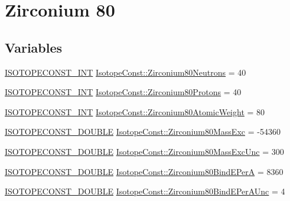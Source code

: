 \hypertarget{group___isotope_const-_zirconium-_zr80}{}\section{Zirconium 80}
\label{group___isotope_const-_zirconium-_zr80}
\subsection*{Variables}
\begin{DoxyCompactItemize}
\item 
\mbox{\hyperlink{group___isotope_const-_macros_ga5f18360b3e99483a35c32d789e62621c}{I\+S\+O\+T\+O\+P\+E\+C\+O\+N\+S\+T\+\_\+\+I\+NT}} \mbox{\hyperlink{group___isotope_const-_zirconium-_zr80_gaae5a1c6b83ec6385f82de4f3098d882a}{Isotope\+Const\+::\+Zirconium80\+Neutrons}} = 40
\item 
\mbox{\hyperlink{group___isotope_const-_macros_ga5f18360b3e99483a35c32d789e62621c}{I\+S\+O\+T\+O\+P\+E\+C\+O\+N\+S\+T\+\_\+\+I\+NT}} \mbox{\hyperlink{group___isotope_const-_zirconium-_zr80_ga8c7643118e7909e5654a49f37fa7474e}{Isotope\+Const\+::\+Zirconium80\+Protons}} = 40
\item 
\mbox{\hyperlink{group___isotope_const-_macros_ga5f18360b3e99483a35c32d789e62621c}{I\+S\+O\+T\+O\+P\+E\+C\+O\+N\+S\+T\+\_\+\+I\+NT}} \mbox{\hyperlink{group___isotope_const-_zirconium-_zr80_ga37bcdf51862008f0669551e320387f4d}{Isotope\+Const\+::\+Zirconium80\+Atomic\+Weight}} = 80
\item 
\mbox{\hyperlink{group___isotope_const-_macros_ga8f45a7272ce02c0b4c65c44636ed719a}{I\+S\+O\+T\+O\+P\+E\+C\+O\+N\+S\+T\+\_\+\+D\+O\+U\+B\+LE}} \mbox{\hyperlink{group___isotope_const-_zirconium-_zr80_ga8489a4dc9129ebb7b4331c94ea06995b}{Isotope\+Const\+::\+Zirconium80\+Mass\+Exc}} = -\/54360
\item 
\mbox{\hyperlink{group___isotope_const-_macros_ga8f45a7272ce02c0b4c65c44636ed719a}{I\+S\+O\+T\+O\+P\+E\+C\+O\+N\+S\+T\+\_\+\+D\+O\+U\+B\+LE}} \mbox{\hyperlink{group___isotope_const-_zirconium-_zr80_ga4ab3d6df406c160f8bb790fb4d3012a9}{Isotope\+Const\+::\+Zirconium80\+Mass\+Exc\+Unc}} = 300
\item 
\mbox{\hyperlink{group___isotope_const-_macros_ga8f45a7272ce02c0b4c65c44636ed719a}{I\+S\+O\+T\+O\+P\+E\+C\+O\+N\+S\+T\+\_\+\+D\+O\+U\+B\+LE}} \mbox{\hyperlink{group___isotope_const-_zirconium-_zr80_gad4a693739a562c242fdc5826d227bb8d}{Isotope\+Const\+::\+Zirconium80\+Bind\+E\+PerA}} = 8360
\item 
\mbox{\hyperlink{group___isotope_const-_macros_ga8f45a7272ce02c0b4c65c44636ed719a}{I\+S\+O\+T\+O\+P\+E\+C\+O\+N\+S\+T\+\_\+\+D\+O\+U\+B\+LE}} \mbox{\hyperlink{group___isotope_const-_zirconium-_zr80_gade792a0e8e89987bc2e414b1abb2d6e8}{Isotope\+Const\+::\+Zirconium80\+Bind\+E\+Per\+A\+Unc}} = 4

\end{DoxyCompactItemize}
